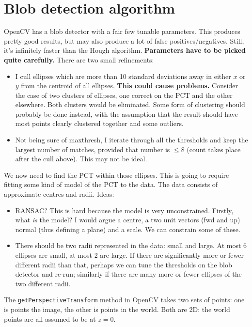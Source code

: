 \section{Blob detection algorithm}
OpenCV has a blob detector with a fair few tunable parameters. This produces pretty good results,
but may also produce a lot of false positives/negatives. Still, it's infinitely faster than the
Hough algorithm. \textbf{Parameters have to be picked quite carefully.} There are two small refinements:
\begin{itemize}
\item I cull ellipses which are more than 10 standard deviations away in either $x$ or $y$ from
the centroid of all ellipses. \textbf{This could cause problems.} Consider
the case of two clusters of ellipses, one correct on the PCT and the other
elsewhere. Both clusters would be eliminated. Some form of clustering
should probably be done instead, with the assumption that the result
should have most points clearly clustered together and some outliers.
\item Not being sure of maxthresh, I iterate through all the thresholds and keep the largest number of
matches, provided that number is $\le 8$ (count takes place after the cull above). This may not be ideal.
\end{itemize}


We now need to find the PCT within those ellipses. This is going to require fitting some kind of
model of the PCT to the data. The data consists of approximate centres and radii. 
Ideas:
\begin{itemize}
\item RANSAC? This is hard because the model is very unconstrained. Firstly, what \emph{is} the
model? I would argue a centre, a two unit vectors (fwd and up) normal (thus defining a plane) and a scale.
We can constrain some of these.
\item There should be two radii represented in the data: small and large. At most 6 ellipses are small, at most
2 are large. If there are significantly more or fewer different radii than that, perhaps we can tune the thresholds on the blob
detector and re-run; similarly if there are many more or fewer ellipses of the two different radii.
\end{itemize}
The \verb+getPerspectiveTransform+ method in OpenCV takes two sets of 
points: one is points the image, the other is points in the world. Both are 2D: the world points
are all assumed to be at $z=0$. 
